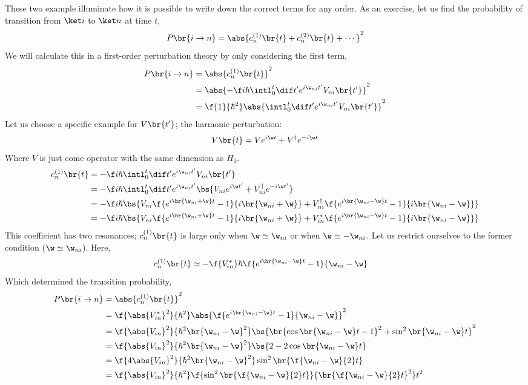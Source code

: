 \documentclass{article}
\begin{document}
These two example illuminate how it is possible to write down the correct terms for any order. As an exercise, let us find the probability of transition from $\ket i$ to $\ket n$ at time $t$,
\[ P\br{i \to n} = \abs{c_{n}^{(1)}\br{t} + c_{n}^{(2)}\br{t} + \cdots }^2 \]
We will calculate this in a first-order perturbation theory by only considering the first term,
\begin{align*}
P\br{i \to n}
&= \abs{c_{n}^{(1)}\br{t}}^2 \\
&= \abs{- \f i \hbar \intl_{0}^{t} \dif t' e^{i \w_{ni} t'}  V_{ni}\br{t'}}^2 \\
&= \f{1}{\hbar^2} \abs{\intl_{0}^{t} \dif t' e^{i \w_{ni} t'}  V_{ni}\br{t'}}^2
\end{align*}
Let us choose a specific example for $V\br{t'}$; the harmonic perturbation:
\[ V\br{t} = V e^{i \w t} + V^{\dagger} e^{-i \w t} \]
Where $V$ is just come operator with the same dimension as $H_0$.
\begin{align*}
    c_n^{(1)}\br{t}
    &= - \f i \hbar \intl_{0}^{t} \dif t' e^{i \w_{ni} t'} V_{ni}\br{t'} \\
    &= - \f i \hbar \intl_{0}^{t} \dif t' e^{i \w_{ni} t'} \bs{V_{ni} e^{i \w t'} + V^{\dagger}_{ni} e^{- i \w t'}} \\
    &= - \f i \hbar \bs{V_{ni} \f{e^{i \br{\w_{ni} + \w} t} - 1}{i\br{\w_{ni} + \w}} + V^{\dagger}_{ni} \f{e^{i \br{\w_{ni} - \w} t} - 1}{i\br{\w_{ni} - \w}}}\\
    &= - \f i \hbar \bs{V_{ni} \f{e^{i \br{\w_{ni} + \w} t} - 1}{i\br{\w_{ni} + \w}} + V^{*}_{in} \f{e^{i \br{\w_{ni} - \w} t} - 1}{i\br{\w_{ni} - \w}}}
\end{align*}
This coefficient has two resonances; $c_n^{(1)}\br{t}$ is large only when $\w \simeq \w_{ni}$ or when $\w \simeq - \w_{ni}$. Let us restrict ourselves to the former condition ($\w \simeq \w_{ni}$). Here,
\begin{align*}
    c_n^{(1)}\br{t}
    &\simeq - \f {V^{*}_{in}} \hbar { \f{e^{i \br{\w_{ni} - \w} t} - 1}{\w_{ni} - \w}}
\end{align*}
Which determined the transition probability,
\begin{align*}
    P\br{i \to n}
    &= \abs{c_n^{(1)}\br{t}}^2 \\
    &= \f {\abs{V^{*}_{in}}^2} {\hbar^2} \abs{ \f{e^{i \br{\w_{ni} - \w} t} - 1}{\w_{ni} - \w}}^2 \\
    &= \f {\abs{V_{in}}^2} {\hbar^2  \br{\w_{ni} - \w}^2} \bs{\br{\cos \br{\w_{ni} - \w} t - 1}^2 + \sin^2 \br{\w_{ni} - \w} t}^2 \\
    &= \f {\abs{V_{in}}^2} {\hbar^2  \br{\w_{ni} - \w}^2} \bs{2 - 2 \cos \br{\w_{ni} - \w} t} \\
    &= \f {4\abs{V_{in}}^2} {\hbar^2  \br{\w_{ni} - \w}^2} \sin^2 \br{\f{\w_{ni} - \w}{2} t} \\
    &= \f {\abs{V_{in}}^2} {\hbar^2} \f{\sin^2 \br{\f{\w_{ni} - \w}{2} t}}{\br{\f{\w_{ni} - \w}{2} t}^2} t^2
\end{align*}
\end{document}
